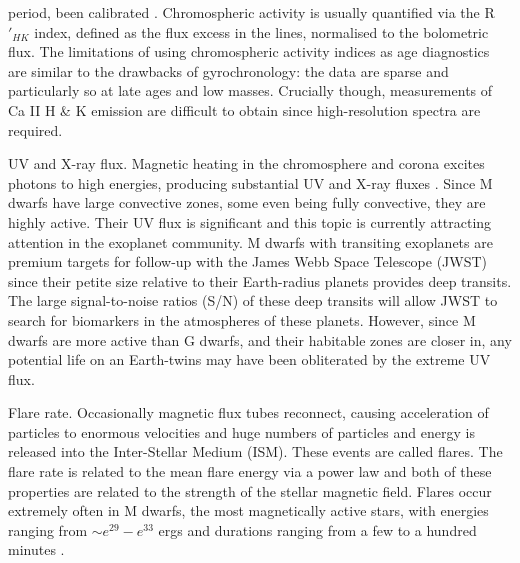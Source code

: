 \begin{itemize}
{{period, been calibrated \citep[\eg][]{Soderblom1991, Donahue1993,
Lachaume1999, Mamajek2008}.
Chromospheric activity is usually quantified via the R$\prime_{HK}$ index,
defined as the flux excess in the lines, normalised to the bolometric flux.
The limitations of using chromospheric activity indices as age diagnostics are
similar to the drawbacks of gyrochronology: the data are sparse and
particularly so at late ages and low masses.
Crucially though, measurements of Ca II H \& K emission are difficult to
obtain since high-resolution spectra are required.
}
\item{UV and X-ray flux.}
Magnetic heating in the chromosphere and corona excites photons to high
energies, producing substantial UV and X-ray fluxes
\citep[\eg][]{Pallavicini1981}.
Since M dwarfs have large convective zones, some even being fully convective,
they are highly active.
Their UV flux is significant and this topic is currently attracting attention
in the exoplanet community.
M dwarfs with transiting exoplanets are premium targets for follow-up with the
James Webb Space Telescope (JWST) since their petite size relative to their
Earth-radius planets provides deep transits.
The large signal-to-noise ratios (S/N) of these deep transits will allow JWST
to search for biomarkers in the atmospheres of these planets.
However, since M dwarfs are more active than G dwarfs, and their habitable
zones are closer in, any potential life on an Earth-twins may have been
obliterated by the extreme UV flux.}
\item{Flare rate.
Occasionally magnetic flux tubes reconnect, causing acceleration of particles
to enormous velocities and huge numbers of particles and energy is released
into the Inter-Stellar Medium (ISM).
These events are called flares.
The flare rate is related to the mean flare energy via a power law
\citep{Davenport2015, Hawley2014} and both of these properties are related to
the strength of the stellar magnetic field.
Flares occur extremely often in M dwarfs, the most magnetically active stars,
with energies ranging from $\sim e^{29} - e^{33}$ ergs and durations ranging
from a few to a hundred minutes \citep{Hawley2014}.}
\end{itemize}

